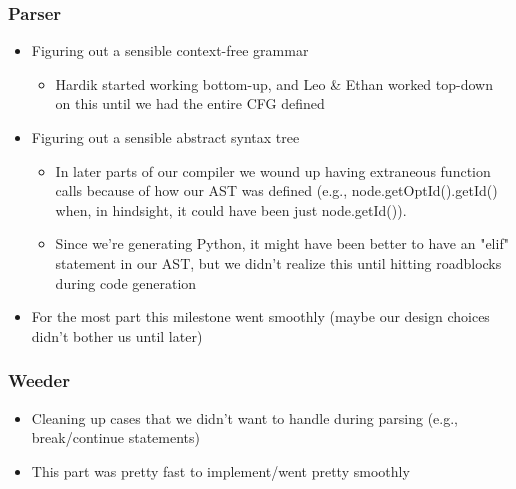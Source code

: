 \documentclass{article}
\begin{document}
\subsubsection{Parser}
\begin{itemize}
\item Figuring out a sensible context-free grammar
\begin{itemize}
	\item Hardik started working bottom-up, and Leo \& Ethan worked top-down on this until we had the entire CFG defined
\end{itemize}
\item Figuring out a sensible abstract syntax tree
\begin{itemize}
	\item In later parts of our compiler we wound up having extraneous function calls because of how our AST was defined (e.g., node.getOptId().getId() when, in hindsight, it could have been just node.getId()).
	\item Since we're generating Python, it might have been better to have an "elif" statement in our AST, but we didn't realize this until hitting roadblocks during code generation
\end{itemize}
\item For the most part this milestone went smoothly (maybe our design choices didn't bother us until later)
\end{itemize}
\subsubsection{Weeder}
\begin{itemize}
\item Cleaning up cases that we didn't want to handle during parsing (e.g., break/continue statements)
\item This part was pretty fast to implement/went pretty smoothly
\end{itemize}
\end{document}
